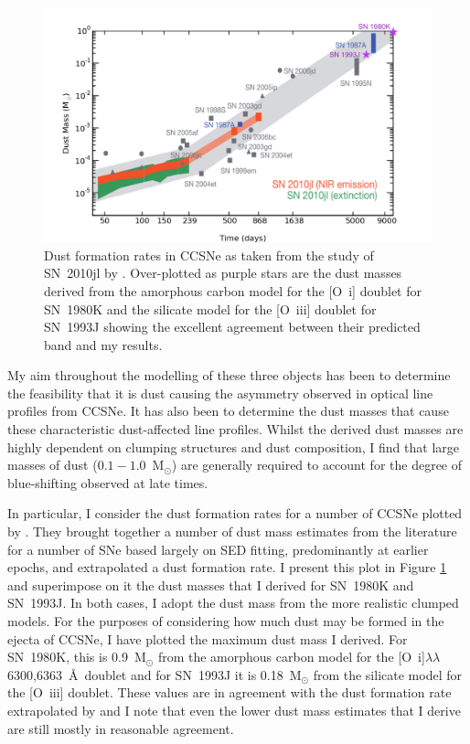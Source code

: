 \begin{figure}[!t]
\centering
\includegraphics[scale=0.6,clip=true, trim=30 0 50 0]{chapters/chapter6/figs/test2.png}
\caption{Dust formation rates in CCSNe as taken from the study of SN~2010jl by \citet{Gall2014}.  Over-plotted as purple stars are the dust masses derived from the amorphous carbon model for the [O~{\sc i}] doublet for SN~1980K and the silicate model for the [O~{\sc iii}] doublet for SN~1993J showing the excellent agreement between their predicted band and my results.}
\label{dust_masses_gall}
\end{figure}


My aim throughout the modelling of these three objects has been to determine the feasibility that it is dust causing the asymmetry observed in optical line profiles from CCSNe.  It has also been to  determine the dust masses that cause these characteristic dust-affected line profiles.  Whilst the derived dust masses are highly dependent on clumping structures and dust composition, I find that large masses of dust ($0.1-1.0$~M$_{\odot}$) are generally required to account for the degree of blue-shifting observed at late times.  

In particular, I consider the dust formation rates for a number of  CCSNe plotted by \citet{Gall2014}.  They brought together a number of dust mass estimates from the literature for a number of SNe based largely on SED fitting, predominantly at earlier epochs, and extrapolated a dust formation rate.  I present this plot in Figure \ref{dust_masses_gall} and superimpose on it the dust masses that I derived for SN~1980K and SN~1993J.  In both cases, I adopt the dust mass from the more realistic clumped models.  For the purposes of considering how much dust may be formed in the ejecta of CCSNe, I have plotted the maximum dust mass I derived.  For SN~1980K, this is 0.9~M$_{\odot}$ from the amorphous carbon model for the [O~{\sc i}]$\lambda\lambda$6300,6363~\AA\ doublet and for SN~1993J it is 0.18~M$_{\odot}$ from the silicate model for the [O~{\sc iii}] doublet.  These values are in agreement with the dust formation rate extrapolated by \citet{Gall2014} and I note that even the lower dust mass estimates that I derive are still mostly in reasonable agreement.




